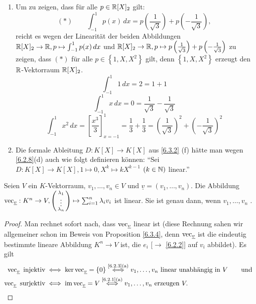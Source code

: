 \documentclass[../../main.tex]{subfiles}
\begin{document}
\begin{bsp}\label{6.3.5}
\begin{enumerate}[\normalfont(a)]
\item Um zu zeigen, dass für alle $p\in \mathbb R[X]_2$ gilt:
$$(*)\qquad \int_{-1}^{1}p(x)\,dx =  p\left(\frac{1}{\sqrt{3}}\right)+p\left(-\frac{1}{\sqrt{3}}\right),$$
reicht es wegen der Linearität der beiden Abbildungen $\mathbb R[X]_2\to \mathbb R, p\mapsto\int_{-1}^{1}p(x)\,dx$ und $\mathbb R[X]_2\to \mathbb R, p\mapsto p\left(\frac{1}{\sqrt{3}}\right)+p\left(-\frac{1}{\sqrt{3}}\right)$ zu zeigen, dass $(*)$ für alle $p\in \left\{1,X,X^2\right\}$ gilt, denn $\left\{1,X,X^2\right\}$ erzeugt den $\mathbb R$-Vektorraum $\mathbb R[X]_2$.
$$\int_{-1}^{1}1\, dx = 2 = 1+1$$
$$\int_{-1}^{1}x\, dx = 0 = \frac{1}{\sqrt{3}}-\frac{1}{\sqrt{3}}$$
$$\int_{-1}^{1}x^2\, dx = \left[\frac{x^3}{3}\right]_{x = -1}^{1}= \frac{1}{3}+\frac{1}{3} = \left(\frac{1}{\sqrt{3}}\right)^2 +\left(-\frac{1}{\sqrt{3}}\right)^2$$
\item Die formale Ableitung $D:K[X]\to K[X]$ aus \ref{6.3.2} (f) hätte man wegen \ref{6.2.8}(d) auch wie folgt definieren können: "`Sei $D\colon K[X]\to K[X], 1\mapsto 0 , X^k\mapsto kX^{k-1}$ $(k\in \mathbb N)$ linear."'
\end{enumerate}
\end{bsp}

\begin{pro}\label{6.3.6}
Seien $V$ ein $K$-Vektorraum, $v_1,\ldots,v_n\in V$ und $\underline{v}=(v_1,\ldots,v_n)$. Die Abbildung $\operatorname{vec}_{\underline{v}}: K^n \to V, \left(\begin{smallmatrix}\lambda_1\\\vdots\\\lambda_n\end{smallmatrix}\right)\mapsto \sum_{i=1}^{n}\lambda_i v_i$ ist linear. Sie ist  genau dann, wenn $v_1,\ldots,v_n$ .
\end{pro}
\begin{proof}
Man rechnet sofort nach, dass $\operatorname{vec}_{\underline{v}}$ linear ist (diese Rechnung sahen wir allgemeiner schon im Beweis von
Proposition \ref{6.3.4}, denn $\operatorname{vec}_{\underline{v}}$ ist
die eindeutig bestimmte lineare Abbildung $K^n\to V$ ist, die $e_i$ [$\to$ \ref{6.2.2}] auf $v_i$ abbildet).
Es gilt
\begin{align*}
\operatorname{vec}_{\underline{v}}\text{ injektiv}&\iff\ker\operatorname{vec}_{\underline{v}} = \left\{0\right\}\overset{\text{\ref{6.2.3}(a)}}{\iff}
v_1,\ldots,v_n\text{ linear unabhängig in }V\qquad\text{und}\\
\operatorname{vec}_{\underline{v}}\text{ surjektiv}&\iff\operatorname{im}\operatorname{vec}_{\underline{v}}=V\overset{\text{\ref{6.2.1}(a)}}{\iff} v_1,\ldots,v_n
\text{ erzeugen }V.
\end{align*}
\end{proof}
\end{document}
